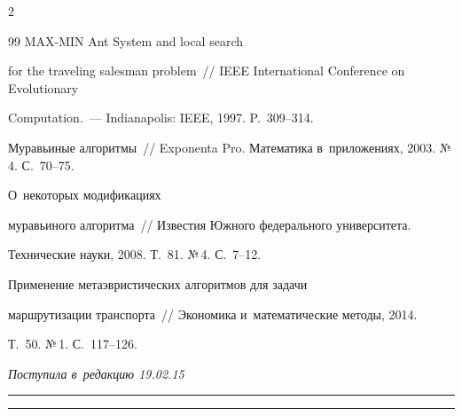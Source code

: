 \begin{multicols}{2}
{{\begin{thebibliography}{99}
 MAX-MIN Ant System and local search

for the traveling salesman problem~// IEEE International Conference on Evolutionary

Computation.~--- Indianapolis: IEEE, 1997. P.~309--314.




 Муравьиные алгоритмы~// Exponenta Pro. Математика в~приложениях, 2003. №\,4. С.~70--75.


 О~некоторых модификациях

муравьиного алгоритма~// Известия Южного федерального университета.

Технические науки, 2008. Т.~81. №\,4. С.~7--12.


 Применение метаэвристических алгоритмов для задачи

маршрутизации транспорта~// Экономика и~математические методы, 2014.

Т.~50. №\,1. С.~117--126.



 \end{thebibliography}



 }

 }



\end{multicols}



\vspace*{-9pt}



\hfill{\small\textit{Поступила в~редакцию 19.02.15}}






\vspace*{7pt}



\hrule



\vspace*{2pt}



\hrule






